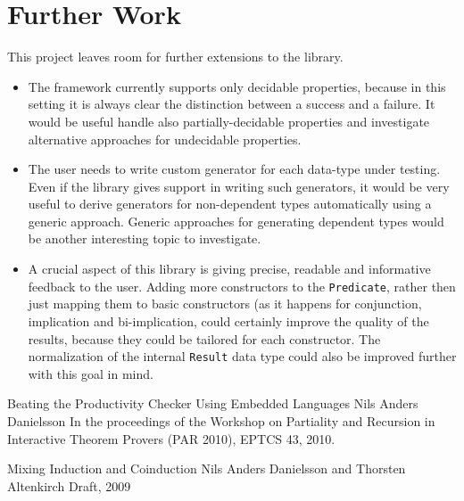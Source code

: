 \documentclass[10pt,a4paper]{article}
\begin{document}
\section{Further Work}
This project leaves room for further extensions to the library.
\begin{itemize}
	\item The framework currently supports only decidable properties, because in this setting it is always clear the distinction between a success and a failure. 	It would be useful handle also partially-decidable properties and investigate alternative approaches for undecidable properties.	
	\item The user needs to write custom generator for each data-type under testing. Even if the library gives support in writing such generators, it would be very useful to derive generators for non-dependent types automatically using a generic approach. Generic approaches for generating dependent types would be another interesting topic to investigate.
	
	\item A crucial aspect of this library is giving precise, readable and informative feedback to the user. Adding more constructors to the \texttt{Predicate}, rather then just mapping them to basic constructors (as it happens for conjunction, implication and bi-implication, could certainly improve the quality of the results, because they could be tailored for each constructor. The normalization of the internal \texttt{Result} data type could also be improved further with this goal in mind.
\end{itemize}

\begin{thebibliography}{1}

	Beating the Productivity Checker Using Embedded Languages
	Nils Anders Danielsson
	In the proceedings of the Workshop on Partiality and Recursion in Interactive Theorem Provers (PAR 2010), EPTCS 43, 2010.

	Mixing Induction and Coinduction
	Nils Anders Danielsson and Thorsten Altenkirch
	Draft, 2009

\end{thebibliography}
\end{document}
